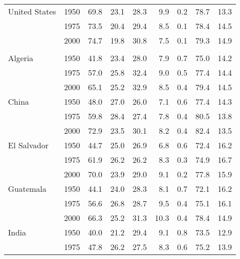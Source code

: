 \begin{longtable}[t]{llrrrrrrr}
\hspace{1em}United States & 1950 & 69.8 & 23.1 & 28.3 & 9.9 & 0.2 & 78.7 & 13.3\\
\hspace{1em} & 1975 & 73.5 & 20.4 & 29.4 & 8.5 & 0.1 & 78.4 & 14.5\\
\hspace{1em} & 2000 & 74.7 & 19.8 & 30.8 & 7.5 & 0.1 & 79.3 & 14.9\\
\addlinespace[0.3em]
\multicolumn{9}{l}{\textbf{Medium mortality}}\\
\hspace{1em}Algeria & 1950 & 41.8 & 23.4 & 28.0 & 7.9 & 0.7 & 75.0 & 14.2\\
\hspace{1em} & 1975 & 57.0 & 25.8 & 32.4 & 9.0 & 0.5 & 77.4 & 14.4\\
\hspace{1em} & 2000 & 65.1 & 25.2 & 32.9 & 8.5 & 0.4 & 79.4 & 14.5\\
\hspace{1em}China & 1950 & 48.0 & 27.0 & 26.0 & 7.1 & 0.6 & 77.4 & 14.3\\
\hspace{1em} & 1975 & 59.8 & 28.4 & 27.4 & 7.8 & 0.4 & 80.5 & 13.8\\
\hspace{1em} & 2000 & 72.9 & 23.5 & 30.1 & 8.2 & 0.4 & 82.4 & 13.5\\
\hspace{1em}El Salvador & 1950 & 44.7 & 25.0 & 26.9 & 6.8 & 0.6 & 72.4 & 16.2\\
\hspace{1em} & 1975 & 61.9 & 26.2 & 26.2 & 8.3 & 0.3 & 74.9 & 16.7\\
\hspace{1em} & 2000 & 70.0 & 23.9 & 29.0 & 9.1 & 0.2 & 77.8 & 15.9\\
\hspace{1em}Guatemala & 1950 & 44.1 & 24.0 & 28.3 & 8.1 & 0.7 & 72.1 & 16.2\\
\hspace{1em} & 1975 & 56.6 & 26.8 & 28.7 & 9.5 & 0.4 & 75.1 & 16.1\\
\hspace{1em} & 2000 & 66.3 & 25.2 & 31.3 & 10.3 & 0.4 & 78.4 & 14.9\\
\hspace{1em}India & 1950 & 40.0 & 21.2 & 29.4 & 9.1 & 0.8 & 73.5 & 12.9\\
\hspace{1em} & 1975 & 47.8 & 26.2 & 27.5 & 8.3 & 0.6 & 75.2 & 13.9\\

\end{longtable}
